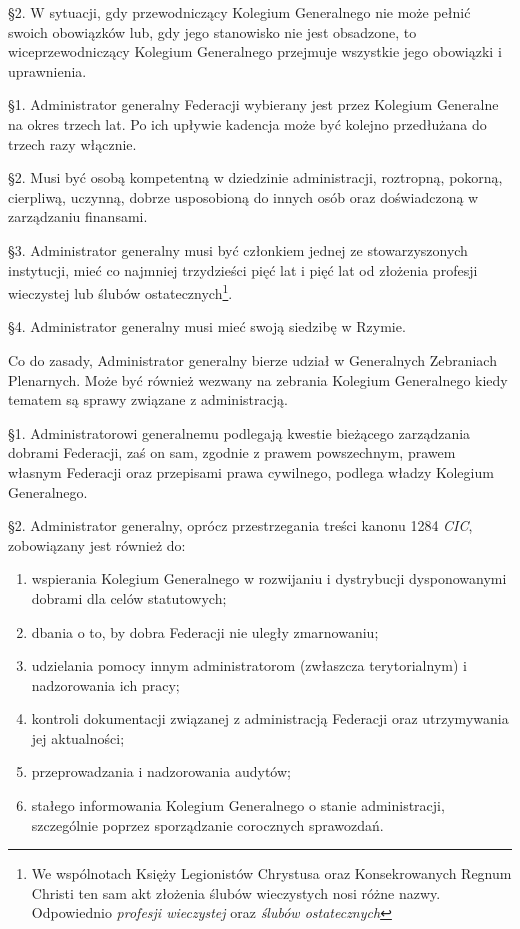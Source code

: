\S{}2. W sytuacji, gdy przewodniczący Kolegium Generalnego nie może pełnić swoich obowiązków lub, gdy jego stanowisko nie jest obsadzone, to wiceprzewodniczący Kolegium Generalnego przejmuje wszystkie jego obowiązki i uprawnienia.
 


 \S{}1. Administrator generalny Federacji wybierany jest przez Kolegium Generalne na okres trzech lat. Po ich upływie kadencja może być kolejno przedłużana do trzech razy włącznie.


\S{}2. Musi być osobą kompetentną w dziedzinie administracji, roztropną, pokorną, cierpliwą, uczynną, dobrze usposobioną do innych osób oraz doświadczoną w zarządzaniu finansami.


\S{}3. Administrator generalny musi być członkiem jednej ze stowarzyszonych instytucji, mieć co najmniej trzydzieści pięć lat i pięć lat od złożenia profesji wieczystej lub ślubów ostatecznych\footnote{We wspólnotach Księży Legionistów Chrystusa oraz Konsekrowanych Regnum Christi ten sam akt złożenia ślubów wieczystych nosi różne nazwy. Odpowiednio {\em profesji wieczystej} oraz {\em ślubów ostatecznych}}.


\S{}4. Administrator generalny musi mieć swoją siedzibę w Rzymie.
 
 Co do zasady, Administrator generalny bierze udział w Generalnych Zebraniach Plenarnych. Może być również wezwany na zebrania Kolegium Generalnego kiedy tematem są sprawy związane z administracją.




\filbreak{} \S{}1. Administratorowi generalnemu podlegają kwestie bieżącego zarządzania dobrami Federacji, zaś on sam, zgodnie z prawem powszechnym, prawem własnym Federacji oraz przepisami prawa cywilnego, podlega władzy Kolegium Generalnego.


\S{}2. Administrator generalny, oprócz przestrzegania treści kanonu 1284 {\em CIC}, zobowiązany jest również do:


\begin{enumerate}


\item wspierania Kolegium Generalnego w rozwijaniu i dystrybucji dysponowanymi dobrami dla celów statutowych;


\item dbania o to, by dobra Federacji nie uległy zmarnowaniu;


\item udzielania pomocy innym administratorom (zwłaszcza terytorialnym) i nadzorowania ich pracy;


\item kontroli dokumentacji związanej z administracją Federacji oraz utrzymywania jej aktualności;


\item przeprowadzania i nadzorowania audytów;


\item stałego informowania Kolegium Generalnego o stanie administracji, szczególnie poprzez sporządzanie corocznych sprawozdań.


\end{enumerate}
 

